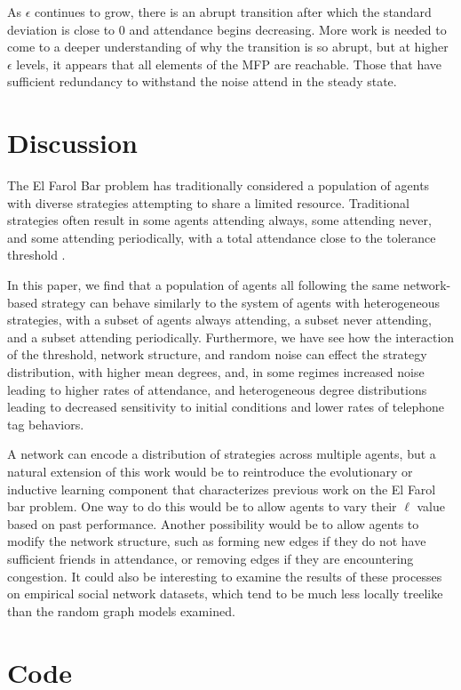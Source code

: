\documentclass[12pt]{article}
\begin{document}
As $\epsilon$ continues to grow, there is an abrupt transition after which the standard deviation is close to 0 and attendance begins decreasing.  More work is needed to come to a deeper understanding of why the transition is so abrupt, but at higher $\epsilon$ levels, it appears that all elements of the MFP are reachable.  Those that have sufficient redundancy to withstand the noise attend in the steady state.  

\section{Discussion}

The El Farol Bar problem has traditionally considered a population of agents with diverse strategies attempting to share a limited resource.  Traditional strategies often result in some agents attending always, some attending never, and some attending periodically, with a total attendance close to the tolerance threshold\cite{arthur:1994} \cite{stLuce:2020}.

In this paper, we find that a population of agents all following the same network-based strategy can behave similarly to the system of agents with heterogeneous strategies, with a subset of agents always attending, a subset never attending, and a subset attending periodically.  Furthermore, we have see how the interaction of the threshold, network structure, and random noise can effect the strategy distribution, with higher mean degrees, and, in some regimes increased noise leading to higher rates of attendance, and heterogeneous degree distributions leading to decreased sensitivity to initial conditions and lower rates of telephone tag behaviors.

A network can encode a distribution of strategies across multiple agents, but a natural extension of this work would be to reintroduce the evolutionary or inductive learning component that characterizes previous work on the El Farol bar problem.  One way to do this would be to allow agents to vary their $\ell$ value based on past performance.  Another possibility would be to allow agents to modify the network structure, such as forming new edges if they do not have sufficient friends in attendance, or removing edges if they are encountering congestion.  It could also be interesting to examine the results of these processes on empirical social network datasets, which tend to be much less locally treelike than the random graph models examined.    

\section*{Code}
\end{document}
